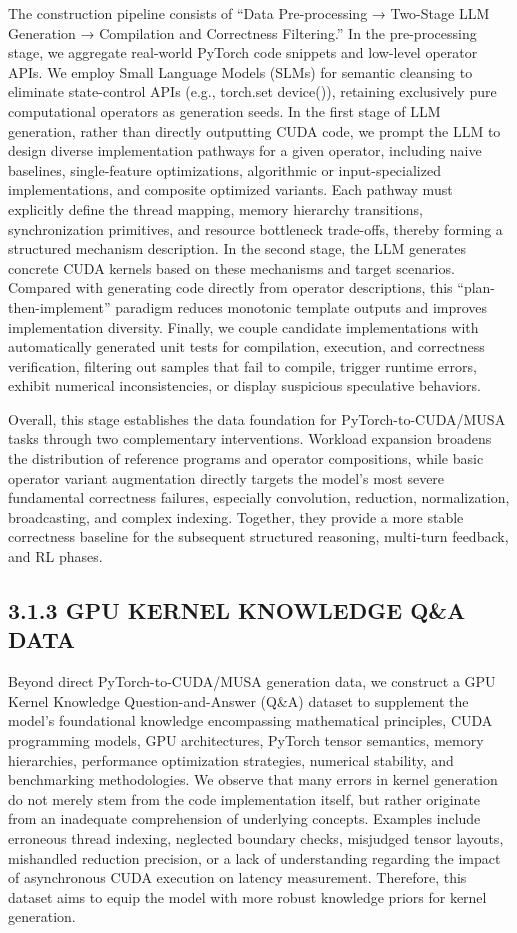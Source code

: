 \documentclass[
  10
]{article}
\begin{document}
The construction pipeline consists of ``Data Pre-processing → Two-Stage
LLM Generation → Compilation and Correctness Filtering.'' In the
pre-processing stage, we aggregate real-world PyTorch code snippets and
low-level operator APIs. We employ Small Language Models (SLMs) for
semantic cleansing to eliminate state-control APIs (e.g., torch.set
device()), retaining exclusively pure computational operators as
generation seeds. In the first stage of LLM generation, rather than
directly outputting CUDA code, we prompt the LLM to design diverse
implementation pathways for a given operator, including naive baselines,
single-feature optimizations, algorithmic or input-specialized
implementations, and composite optimized variants. Each pathway must
explicitly define the thread mapping, memory hierarchy transitions,
synchronization primitives, and resource bottleneck trade-offs, thereby
forming a structured mechanism description. In the second stage, the LLM
generates concrete CUDA kernels based on these mechanisms and target
scenarios. Compared with generating code directly from operator
descriptions, this ``plan-then-implement'' paradigm reduces monotonic
template outputs and improves implementation diversity. Finally, we
couple candidate implementations with automatically generated unit tests
for compilation, execution, and correctness verification, filtering out
samples that fail to compile, trigger runtime errors, exhibit numerical
inconsistencies, or display suspicious speculative behaviors.

Overall, this stage establishes the data foundation for
PyTorch-to-CUDA/MUSA tasks through two complementary interventions.
Workload expansion broadens the distribution of reference programs and
operator compositions, while basic operator variant augmentation
directly targets the model's most severe fundamental correctness
failures, especially convolution, reduction, normalization,
broadcasting, and complex indexing. Together, they provide a more stable
correctness baseline for the subsequent structured reasoning, multi-turn
feedback, and RL phases.

\subsection{3.1.3 GPU KERNEL KNOWLEDGE Q\&A
DATA}\label{gpu-kernel-knowledge-qa-data}

Beyond direct PyTorch-to-CUDA/MUSA generation data, we construct a GPU
Kernel Knowledge Question-and-Answer (Q\&A) dataset to supplement the
model's foundational knowledge encompassing mathematical principles,
CUDA programming models, GPU architectures, PyTorch tensor semantics,
memory hierarchies, performance optimization strategies, numerical
stability, and benchmarking methodologies. We observe that many errors
in kernel generation do not merely stem from the code implementation
itself, but rather originate from an inadequate comprehension of
underlying concepts. Examples include erroneous thread indexing,
neglected boundary checks, misjudged tensor layouts, mishandled
reduction precision, or a lack of understanding regarding the impact of
asynchronous CUDA execution on latency measurement. Therefore, this
dataset aims to equip the model with more robust knowledge priors for
kernel generation.
\end{document}
